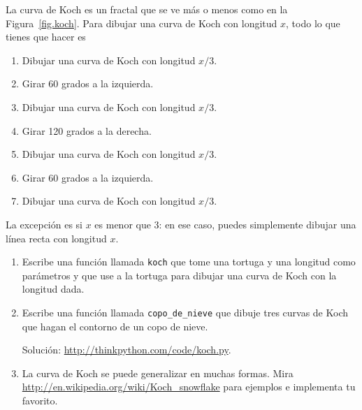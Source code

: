 \documentclass[10pt]{book}
\begin{document}
\begin{exercise}

La curva de Koch es un fractal que se ve más o menos como en la
Figura~\ref{fig.koch}.  Para dibujar una curva de Koch con longitud $x$, todo lo que
tienes que hacer es

\begin{enumerate}

\item Dibujar una curva de Koch con longitud $x/3$.

\item Girar 60 grados a la izquierda.

\item Dibujar una curva de Koch con longitud $x/3$.

\item Girar 120 grados a la derecha.

\item Dibujar una curva de Koch con longitud $x/3$.

\item Girar 60 grados a la izquierda.

\item Dibujar una curva de Koch con longitud $x/3$.

\end{enumerate}

La excepción es si $x$ es menor que 3: en ese caso,
puedes simplemente dibujar una línea recta con longitud $x$.

\begin{enumerate}

\item Escribe una función llamada {\tt koch} que tome una tortuga y
una longitud como parámetros y que use a la tortuga para dibujar una curva de Koch
con la longitud dada.

\item Escribe una función llamada {\tt copo\_de\_nieve} que dibuje tres
curvas de Koch que hagan el contorno de un copo de nieve.

Solución: \url{http://thinkpython.com/code/koch.py}.

\item La curva de Koch se puede generalizar en muchas formas.  Mira
\url{http://en.wikipedia.org/wiki/Koch_snowflake} para ejemplos e
implementa tu favorito.

\end{enumerate}
\end{exercise}
\end{document}
